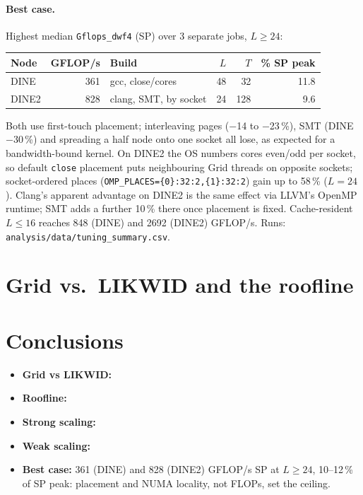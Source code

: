 \documentclass[9pt,a4paper,twocolumn]{extarticle}
\begin{document}
\paragraph{Best case.} Highest median \texttt{Gflops\_dwf4} (SP) over 3 separate jobs, $L\ge24$:
\begin{center}\small\setlength{\tabcolsep}{3pt}
\begin{tabular}{@{}lrlrrr@{}}\toprule
Node & GFLOP/s & Build & $L$ & $T$ & \% SP peak\\\midrule
DINE  & 361 & gcc, close/cores & 48 & 32 & 11.8\\
DINE2 & 828 & clang, SMT, by socket & 24 & 128 & 9.6\\
\bottomrule\end{tabular}\end{center}
Both use first-touch placement; interleaving pages ($-$14 to $-$23\,\%), SMT (DINE $-$30\,\%) and
spreading a half node onto one socket all lose, as expected for a bandwidth-bound kernel. On DINE2 the
OS numbers cores even/odd per socket, so default \texttt{close} placement puts neighbouring Grid threads
on opposite sockets; socket-ordered places (\texttt{OMP\_PLACES=\{0\}:32:2,\{1\}:32:2}) gain up to 58\,\%
($L=24$). Clang's apparent advantage on DINE2 is the same effect via LLVM's OpenMP runtime; SMT adds a
further 10\,\% there once placement is fixed. Cache-resident $L\le16$ reaches 848 (DINE) and 2692 (DINE2) GFLOP/s.
Runs: \texttt{analysis/data/tuning\_summary.csv}.

\section{Grid vs.\ LIKWID and the roofline}  %

\section{Conclusions}       %
\begin{itemize}\setlength{\itemsep}{0pt}
\item \textbf{Grid vs LIKWID:} %
\item \textbf{Roofline:} %
\item \textbf{Strong scaling:} %
\item \textbf{Weak scaling:} %
\item \textbf{Best case:} 361 (DINE) and 828 (DINE2) GFLOP/s SP at $L\ge24$, 10--12\,\% of SP peak: placement and NUMA locality, not FLOPs, set the ceiling.
\end{itemize}
\end{document}
